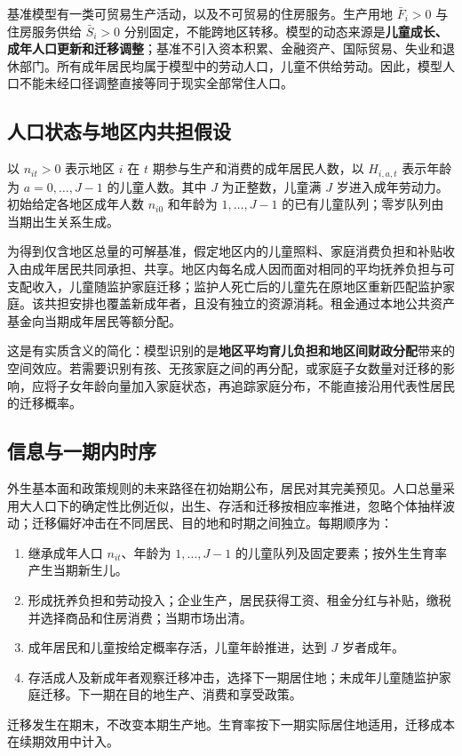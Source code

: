 \documentclass[UTF8,a4paper,zihao=-4,fontset=windows]{ctexart}
\numberwithin{equation}{section}
\begin{document}
基准模型有一类可贸易生产活动，以及不可贸易的住房服务。生产用地 $\bar F_i>0$ 与住房服务供给 $\bar S_i>0$ 分别固定，不能跨地区转移。模型的动态来源是\textbf{儿童成长、成年人口更新和迁移调整}；基准不引入资本积累、金融资产、国际贸易、失业和退休部门。所有成年居民均属于模型中的劳动人口，儿童不供给劳动。因此，模型人口不能未经口径调整直接等同于现实全部常住人口。

\subsection{人口状态与地区内共担假设}
以 $n_{it}>0$ 表示地区 $i$ 在 $t$ 期参与生产和消费的成年居民人数，以 $H_{i,a,t}$ 表示年龄为 $a=0,\ldots,J-1$ 的儿童人数。其中 $J$ 为正整数，儿童满 $J$ 岁进入成年劳动力。初始给定各地区成年人数 $n_{i0}$ 和年龄为 $1,\ldots,J-1$ 的已有儿童队列；零岁队列由当期出生关系生成。

为得到仅含地区总量的可解基准，假定地区内的儿童照料、家庭消费负担和补贴收入由成年居民共同承担、共享。地区内每名成人因而面对相同的平均抚养负担与可支配收入，儿童随监护家庭迁移；监护人死亡后的儿童先在原地区重新匹配监护家庭。该共担安排也覆盖新成年者，且没有独立的资源消耗。租金通过本地公共资产基金向当期成年居民等额分配。

这是有实质含义的简化：模型识别的是\textbf{地区平均育儿负担和地区间财政分配}带来的空间效应。若需要识别有孩、无孩家庭之间的再分配，或家庭子女数量对迁移的影响，应将子女年龄向量加入家庭状态，再追踪家庭分布，不能直接沿用代表性居民的迁移概率。

\subsection{信息与一期内时序}
外生基本面和政策规则的未来路径在初始期公布，居民对其完美预见。人口总量采用大人口下的确定性比例近似，出生、存活和迁移按相应率推进，忽略个体抽样波动；迁移偏好冲击在不同居民、目的地和时期之间独立。每期顺序为：
\begin{enumerate}
  \item 继承成年人口 $n_{it}$、年龄为 $1,\ldots,J-1$ 的儿童队列及固定要素；按外生生育率产生当期新生儿。
  \item 形成抚养负担和劳动投入；企业生产，居民获得工资、租金分红与补贴，缴税并选择商品和住房消费；当期市场出清。
  \item 成年居民和儿童按给定概率存活，儿童年龄推进，达到 $J$ 岁者成年。
  \item 存活成人及新成年者观察迁移冲击，选择下一期居住地；未成年儿童随监护家庭迁移。下一期在目的地生产、消费和享受政策。
\end{enumerate}
迁移发生在期末，不改变本期生产地。生育率按下一期实际居住地适用，迁移成本在续期效用中计入。
\end{document}

